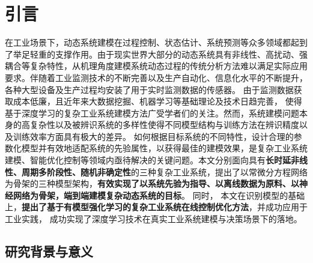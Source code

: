 
\chapter{引言}

\setcounter{page}{1}
在工业场景下，动态系统建模在过程控制、状态估计、系统预测等众多领域都起到了举足轻重的支撑作用。由于现实世界大部分的动态系统具有非线性、高扰动、强耦合等复杂特性，从机理角度建模系统动态过程的传统分析方法难以满足实际应用要求。伴随着工业监测技术的不断完善以及生产自动化、信息化水平的不断提升，各种大型设备及生产过程均安装了用于实时监测数据的传感器。 
由于监测数据获取成本低廉，且近年来大数据挖掘、机器学习等基础理论及技术日趋完善，
使得基于深度学习的复杂工业系统建模方法广受学者们的关注。然而，系统建模问题本身的高复杂性以及被辨识系统的多样性使得不同模型结构与训练方法在辨识精度以及训练效率方面具有极大的差异。
如何根据目标系统的不同特性，设计合理的参数化模型并有效地适配系统的先验属性，以获得最佳的建模效果，是复杂工业系统建模、智能优化控制等领域内亟待解决的关键问题。本文分别面向具有\textbf{长时延非线性、周期多阶段性、随机非确定性}的三种复杂工业系统，提出了以常微分方程网络为骨架的三种模型架构，\textbf{有效实现了以系统先验为指导、以离线数据为原料、以神经网络为骨架，端到端建模复杂动态系统的目标}。
同时，
本文在识别模型的基础上，\textbf{提出了基于有模型强化学习的复杂工业系统在线控制优化方法}，并成功应用于工业实践，
成功实现了深度学习技术在真实工业系统建模与决策场景下的落地。
\section{研究背景与意义}
    




